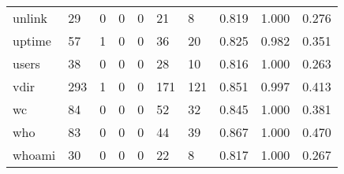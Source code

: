 \begin{longtable}{lp{2.0cm}p{2.0cm}p{2.0cm}p{2.0cm}p{2.0cm}p{2.0cm}p{2.0cm}p{2.0cm}p{2.0cm}}
unlink    &                     29 &                                             0 &                                            0 &                                           0 &                                           21 &                                          8 &                                0.819 &                                  1.000 &                                0.276 \\
uptime    &                     57 &                                             1 &                                            0 &                                           0 &                                           36 &                                         20 &                                0.825 &                                  0.982 &                                0.351 \\
users     &                     38 &                                             0 &                                            0 &                                           0 &                                           28 &                                         10 &                                0.816 &                                  1.000 &                                0.263 \\
vdir      &                    293 &                                             1 &                                            0 &                                           0 &                                          171 &                                        121 &                                0.851 &                                  0.997 &                                0.413 \\
wc        &                     84 &                                             0 &                                            0 &                                           0 &                                           52 &                                         32 &                                0.845 &                                  1.000 &                                0.381 \\
who       &                     83 &                                             0 &                                            0 &                                           0 &                                           44 &                                         39 &                                0.867 &                                  1.000 &                                0.470 \\
whoami    &                     30 &                                             0 &                                            0 &                                           0 &                                           22 &                                          8 &                                0.817 &                                  1.000 &                                0.267 \\

\end{longtable}
